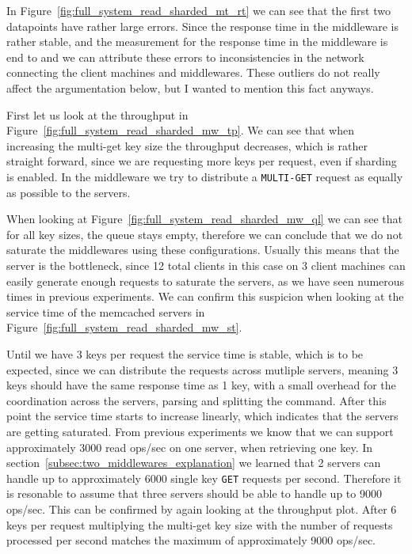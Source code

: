 \documentclass[11pt,a4paper]{article}
\begin{document}
%
In Figure~\ref{fig:full_system_read_sharded_mt_rt} we can see that the first two datapoints have rather large errors.
%
Since the response time in the middleware is rather stable, and the measurement for the response time in the middleware is end to and we can attribute these errors to inconsistencies in the network connecting the client machines and middlewares.
%
These outliers do not really affect the argumentation below, but I wanted to mention this fact anyways.
%
\par
%
First let us look at the throughput in Figure~\ref{fig:full_system_read_sharded_mw_tp}.
%
We can see that when increasing the multi-get key size the throughput decreases, which is rather straight forward, since we are requesting more keys per request, even if sharding is enabled.
%
In the middleware we try to distribute a \texttt{MULTI-GET} request as equally as possible to the servers.
%
\par
%
When looking at Figure~\ref{fig:full_system_read_sharded_mw_ql} we can see that for all key sizes, the queue stays empty, therefore we can conclude that we do not saturate the middlewares using these configurations.
%
Usually this means that the server is the bottleneck, since 12 total clients in this case on 3 client machines can easily generate enough requests to saturate the servers, as we have seen numerous times in previous experiments.
%
We can confirm this suspicion when looking at the service time of the memcached servers in Figure~\ref{fig:full_system_read_sharded_mw_st}.
%
\par
%
Until we have 3 keys per request the service time is stable, which is to be expected, since we can distribute the requests across mutliple servers, meaning 3 keys should have the same response time as 1 key, with a small overhead for the coordination across the servers, parsing and splitting the command.
%
After this point the service time starts to increase linearly, which indicates that the servers are getting saturated.
%
From previous experiments we know that we can support approximately 3000 read ops/sec on one server, when retrieving one key.
%
In section~\ref{subsec:two_middlewares_explanation} we learned that 2 servers can handle up to approximately 6000 single key \texttt{GET} requests per second. 
%
Therefore it is resonable to assume that three servers should be able to handle up to 9000 ops/sec.
%
This can be confirmed by again looking at the throughput plot.
%
After 6 keys per request multiplying the multi-get key size with the number of requests processed per second matches the maximum of approximately 9000 ops/sec.
\end{document}

